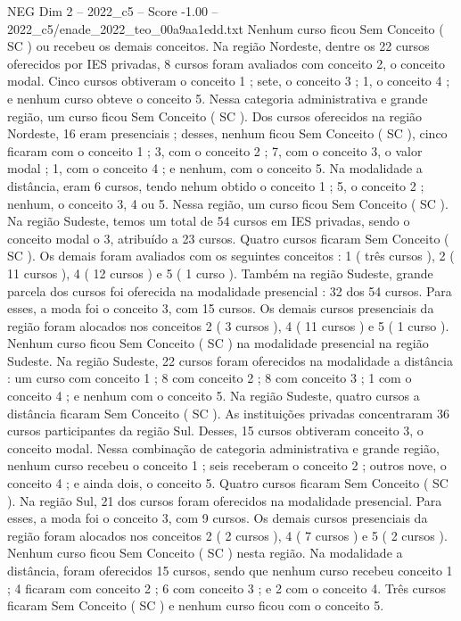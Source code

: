 \begin{textsample}{NEG Dim 2 – 2022\_c5 – Score -1.00 – 2022\_c5/enade\_2022\_teo\_00a9aa1edd.txt}
Nenhum curso ficou Sem Conceito ( SC ) ou recebeu os demais conceitos.
Na região Nordeste, dentre os 22 cursos oferecidos por IES privadas, 8 cursos foram avaliados com conceito 2, o conceito modal.
Cinco cursos obtiveram o conceito 1 ; sete, o conceito 3 ; 1, o conceito 4 ; e nenhum curso obteve o conceito 5.
Nessa categoria administrativa e grande região, um curso ficou Sem Conceito ( SC ).
Dos cursos oferecidos na região Nordeste, 16 eram presenciais ; desses, nenhum ficou Sem Conceito ( SC ), cinco ficaram com o conceito 1 ; 3, com o conceito 2 ; 7, com o conceito 3, o valor modal ; 1, com o conceito 4 ; e nenhum, com o conceito 5.
Na modalidade a distância, eram 6 cursos, tendo nehum obtido o conceito 1 ; 5, o conceito 2 ; nenhum, o conceito 3, 4 ou 5.
Nessa região, um curso ficou Sem Conceito ( SC ).
Na região Sudeste, temos um total de 54 cursos em IES privadas, sendo o conceito modal o 3, atribuído a 23 cursos.
Quatro cursos ficaram Sem Conceito ( SC ).
Os demais foram avaliados com os seguintes conceitos : 1 ( três cursos ), 2 ( 11 cursos ), 4 ( 12 cursos ) e 5 ( 1 curso ).
Também na região Sudeste, grande parcela dos cursos foi oferecida na modalidade presencial : 32 dos 54 cursos.
Para esses, a moda foi o conceito 3, com 15 cursos.
Os demais cursos presenciais da região foram alocados nos conceitos 2 ( 3 cursos ), 4 ( 11 cursos ) e 5 ( 1 curso ).
Nenhum curso ficou Sem Conceito ( SC ) na modalidade presencial na região Sudeste.
Na região Sudeste, 22 cursos foram oferecidos na modalidade a distância : um curso com conceito 1 ; 8 com conceito 2 ; 8 com conceito 3 ; 1 com o conceito 4 ; e nenhum com o conceito 5.
Na região Sudeste, quatro cursos a distância ficaram Sem Conceito ( SC ).
As instituições privadas concentraram 36 cursos participantes da região Sul.
Desses, 15 cursos obtiveram conceito 3, o conceito modal.
Nessa combinação de categoria administrativa e grande região, nenhum curso recebeu o conceito 1 ; seis receberam o conceito 2 ; outros nove, o conceito 4 ; e ainda dois, o conceito 5.
Quatro cursos ficaram Sem Conceito ( SC ).
Na região Sul, 21 dos cursos foram oferecidos na modalidade presencial.
Para esses, a moda foi o conceito 3, com 9 cursos.
Os demais cursos presenciais da região foram alocados nos conceitos 2 ( 2 cursos ), 4 ( 7 cursos ) e 5 ( 2 cursos ).
Nenhum curso ficou Sem Conceito ( SC ) nesta região.
Na modalidade a distância, foram oferecidos 15 cursos, sendo que nenhum curso recebeu conceito 1 ; 4 ficaram com conceito 2 ; 6 com conceito 3 ; e 2 com o conceito 4.
Três cursos ficaram Sem Conceito ( SC ) e nenhum curso ficou com o conceito 5.

\end{textsample}
